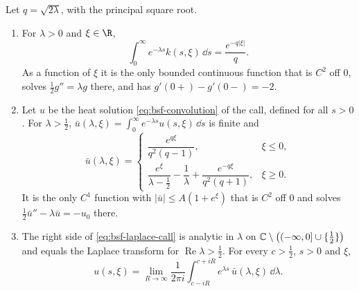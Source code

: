 \begin{proposition}\label{prop:bsf-laplace}
Let $q=\sqrt{2\lambda}$, with the principal square root.
\begin{enumerate}[label=(\roman*)]
  \item For $\lambda>0$ and $\xi\in\R$,
    \begin{equation}\label{eq:bsf-laplace-kernel}
      \int_0^\infty e^{-\lambda s}k(s,\xi)\,\dd s=\frac{e^{-q|\xi|}}{q} .
    \end{equation}
    As a function of $\xi$ it is the only bounded continuous function that is $C^2$ off $0$, solves
    $\frac12g''=\lambda g$ there, and has $g'(0+)-g'(0-)=-2$.
  \item Let $u$ be the heat solution \eqref{eq:bsf-convolution} of the call, defined for all $s>0$. For
    $\lambda>\frac12$, $\bar u(\lambda,\xi)=\int_0^\infty e^{-\lambda s}u(s,\xi)\,\dd s$ is finite and
    \begin{equation}\label{eq:bsf-laplace-call}
      \bar u(\lambda,\xi)=\begin{cases}
        \dfrac{e^{q\xi}}{q^2(q-1)}, & \xi\le0,\\[1.2ex]
        \dfrac{e^\xi}{\lambda-\frac12}-\dfrac1\lambda+\dfrac{e^{-q\xi}}{q^2(q+1)}, & \xi\ge0 .
      \end{cases}
    \end{equation}
    It is the only $C^1$ function with $|\bar u|\le A(1+e^\xi)$ that is $C^2$ off $0$ and solves
    $\frac12\bar u''-\lambda\bar u=-u_0$ there.
  \item The right side of \eqref{eq:bsf-laplace-call} is analytic in $\lambda$ on
    $\mathbb{C}\setminus\big((-\infty,0]\cup\{\frac12\}\big)$ and equals the Laplace transform for
    $\operatorname{Re}\lambda>\frac12$. For every $c>\frac12$, $s>0$ and $\xi$,
    \begin{equation}\label{eq:bsf-bromwich}
      u(s,\xi)=\lim_{R\to\infty}\frac{1}{2\pi i}\int_{c-iR}^{c+iR}e^{\lambda s}\,\bar u(\lambda,\xi)\,\dd\lambda .
    \end{equation}
\end{enumerate}
\end{proposition}

